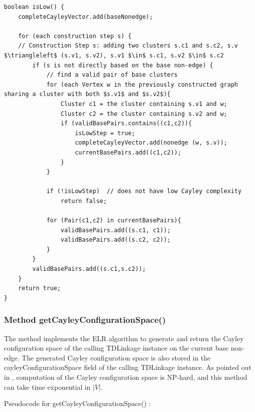 \documentclass[10pt]{article}
\begin{document}
\begin{lstlisting}[mathescape]
boolean isLow() {
	completeCayleyVector.add(baseNonedge);

	for (each construction step s) {
	// Construction Step s: adding two clusters s.c1 and s.c2, s.v $\triangleleft$ (s.v1, s.v2), s.v1 $\in$ s.c1, s.v2 $\in$ s.c2
		if (s is not directly based on the base non-edge) { 
			// find a valid pair of base clusters
			for (each Vertex w in the previously constructed graph sharing a cluster with both $s.v1$ and $s.v2$){
				Cluster c1 = the cluster containing s.v1 and w;
				Cluster c2 = the cluster containing s.v2 and w;
				if (validBasePairs.contains((c1,c2)){
					isLowStep = true;
					completeCayleyVector.add(nonedge (w, s.v));
					currentBasePairs.add((c1,c2));
				}
			}

			if (!isLowStep)  // does not have low Cayley complexity
				return false;

			for (Pair(c1,c2) in currentBasePairs){
				validBasePairs.add((s.c1, c1));
				validBasePairs.add((s.c2, c2));
			}
		}
		validBasePairs.add((s.c1,s.c2));
	}
	return true;
}
\end{lstlisting}



\subsubsection{ Method \textsf{getCayleyConfigurationSpace()}}
\label{sec:getcayleyconfigurationspace}
The method implements the ELR algorithm \cite{Sitharam2011a} %
%
to generate and return the %
Cayley configuration space of the calling \textsf{TDLinkage} instance on the current base non-edge. 
The generated Cayley configuration space is also stored in the \textsf{cayleyConfigurationSpace} field
of the calling \textsf{TDLinkage} instance.
As pointed out in \cite{Sitharam2011a}, computation of the Cayley configuration space is NP-hard, and this method can take time exponential in $|V|$.

\smallskip
 Pseudocode for  \textsf{getCayleyConfigurationSpace()} :
\end{document}
